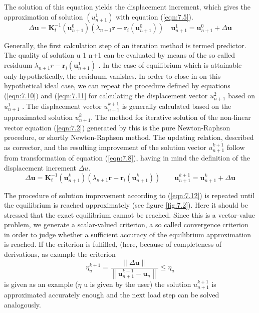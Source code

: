 The solution of this equation yields the displacement increment, which gives the approximation
of solution $(u^1_{ n+1} )$ with equation (\ref{eqn:7.5}).
\begin{equation}
 \Delta \boldsymbol{u}=\mathbf{K}_{t}^{-1}\left(\boldsymbol{u}_{n+1}^{0}\right)\left(\lambda_{n+1} \boldsymbol{r}-\boldsymbol{r}_{i}\left(\boldsymbol{u}_{n+1}^{0}\right)\right) \quad \boldsymbol{u}_{n+1}^{1}=\boldsymbol{u}_{n+1}^{0}+\Delta \boldsymbol{u} 
 \label{eqn:7.11} 
\end{equation}

Generally, the first calculation step of an iteration method is termed predictor. The quality of
solution u 1 n+1 can be evaluated by means of the so called residuum $ \lambda_{n+1} r-\boldsymbol{r}_{i}\left(\boldsymbol{u}_{n+1}^{1}\right) $
. In the
case of equilibrium which is attainable only hypothetically, the residuum vanishes. In order to
close in on this hypothetical ideal case, we can repeat the procedure defined by equations (\ref{eqn:7.10})
and (\ref{eqn:7.11} for calculating the displacement vector $u^2_ {n+1} $ based on $u ^1_{ n+1}$ . The displacement
vector $u_{n+1}^{k+1}$
is generally calculated based on the approximated solution $u ^k_{n+1} $. The method
for iterative solution of the non-linear vector equation (\ref{eqn:7.2}) generated by this is the pure
Newton-Raphson procedure, or shortly Newton-Raphson method. The updating relation,
described as corrector, and the resulting improvement of the solution vector $ u ^{k+1}_{n+1}$ follow from
transformation of equation (\ref{eqn:7.8}), having in mind the definition of the displacement increment
$\Delta u$.
\begin{equation}
 \Delta \boldsymbol{u}=\mathbf{K}_{t}^{-1}\left(\boldsymbol{u}_{n+1}^{k}\right)\left(\lambda_{n+1} \boldsymbol{r}-\boldsymbol{r}_{i}\left(\boldsymbol{u}_{n+1}^{k}\right)\right) \qquad \boldsymbol{u}_{n+1}^{k+1}=\boldsymbol{u}_{n+1}^{k}+\Delta \boldsymbol{u} 
 \label{eqn:7.12} 
\end{equation}

The procedure of solution improvement according to (\ref{eqn:7.12}) is repeated until the equilibrium is
reached approximately (see figure \ref{fig:7.2}). Here it should be stressed that the exact equilibrium
cannot be reached. Since this is a vector-value problem, we generate a scalar-valued criterion, a so called convergence criterion in order to judge whether a sufficient accuracy of the equilibrium
approximation is reached.  If the criterion is fulfilled, (here, because of completeness of
derivations, as example the criterion
\begin{equation}
 \eta_{u}^{k+1}=\frac{\|\Delta \boldsymbol{u}\|}{\left\|\boldsymbol{u}_{n+1}^{k+1}-\boldsymbol{u}_{n}\right\|} \leq \eta_{u} 
\label{eqn:7.13} 
\end{equation}
is given as an example ($\eta$ u is given by the user) the solution $u^{k+1}_{n+1}$ is approximated accurately
enough and the next load step can be solved analogously.

